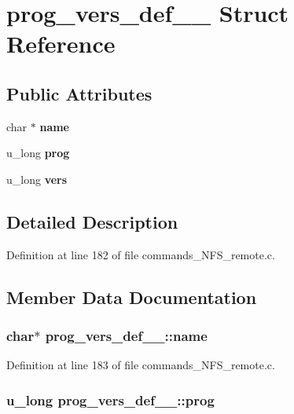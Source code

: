 \section{prog\_\-vers\_\-def\_\-\_\- Struct Reference}
\label{structprog__vers__def____}
\subsection*{Public Attributes}
\begin{CompactItemize}
\item 
char $\ast$ {\bf name}
\item 
u\_\-long {\bf prog}
\item 
u\_\-long {\bf vers}
\end{CompactItemize}


\subsection{Detailed Description}


Definition at line 182 of file commands\_\-NFS\_\-remote.c.

\subsection{Member Data Documentation}
\subsubsection[{name}]{\setlength{\rightskip}{0pt plus 5cm}char$\ast$ {\bf prog\_\-vers\_\-def\_\-\_\-::name}}\label{structprog__vers__def_____6e2b1520b80eae4bf5e021627573e14d}




Definition at line 183 of file commands\_\-NFS\_\-remote.c.
\subsubsection[{prog}]{\setlength{\rightskip}{0pt plus 5cm}u\_\-long {\bf prog\_\-vers\_\-def\_\-\_\-::prog}}\label{structprog__vers__def_____0f0b9160c7fc6013b79add5dd696ed43}




